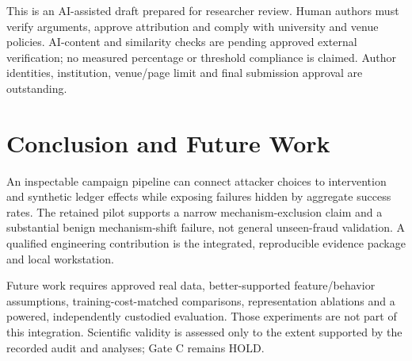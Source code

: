 \documentclass[conference]{IEEEtran}
\begin{document}
This is an AI-assisted draft prepared for researcher review. Human authors must verify arguments, approve attribution and comply with university and venue policies. AI-content and similarity checks are pending approved external verification; no measured percentage or threshold compliance is claimed. Author identities, institution, venue/page limit and final submission approval are outstanding.

\section{Conclusion and Future Work}
An inspectable campaign pipeline can connect attacker choices to intervention and synthetic ledger effects while exposing failures hidden by aggregate success rates. The retained pilot supports a narrow mechanism-exclusion claim and a substantial benign mechanism-shift failure, not general unseen-fraud validation. A qualified engineering contribution is the integrated, reproducible evidence package and local workstation.

Future work requires approved real data, better-supported feature/behavior assumptions, training-cost-matched comparisons, representation ablations and a powered, independently custodied evaluation. Those experiments are not part of this integration. Scientific validity is assessed only to the extent supported by the recorded audit and analyses; Gate C remains HOLD.



\end{document}
